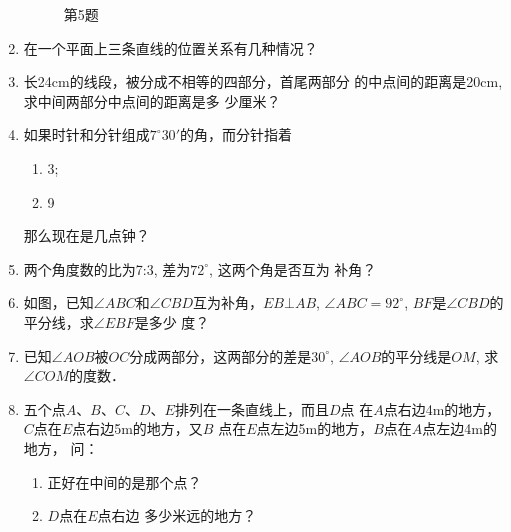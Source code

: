 \begin{enumerate}
\begin{figure}[htp]
\begin{minipage}[t]{0.48\textwidth}
\begin{tikzpicture}[>=latex, scale=1]
	\end{tikzpicture}
	\caption*{第5题}
	\end{minipage}
	\end{figure}

\item 在一个平面上三条直线的位置关系有几种情况？
\item 长24cm的线段，被分成不相等的四部分，首尾两部分
的中点间的距离是20cm, 求中间两部分中点间的距离是多
少厘米？
\item 如果时针和分针组成$7^{\circ}30'$的角，而分针指着
\begin{multicols}{2}
	\begin{enumerate}
		\item 3;
		\item 9
	\end{enumerate}
\end{multicols}
那么现在是几点钟？
\item 两个角度数的比为7:3, 差为$72^{\circ}$, 这两个角是否互为
补角？
\item 如图，已知$\angle ABC$和$\angle CBD$互为补角，$EB\bot AB$, $\angle ABC=92^{\circ}$, $BF$是$\angle CBD$的平分线，求$\angle EBF$是多少
度？
\item 已知$\angle AOB$被$OC$分成两部分，这两部分的差是$30^{\circ}$, 
$\angle AOB$的平分线是$OM$, 求$\angle COM$的度数．
\item 五个点$A$、$B$、$C$、$D$、$E$排列在一条直线上，而且$D$点
在$A$点右边4m的地方，$C$点在$E$点右边5m的地方，又$B$
点在$E$点左边5m的地方，$B$点在$A$点左边4m的地方，
问：
\begin{enumerate}
	\item 正好在中间的是那个点？
	\item $D$点在$E$点右边
多少米远的地方？
\end{enumerate}


\end{enumerate}
